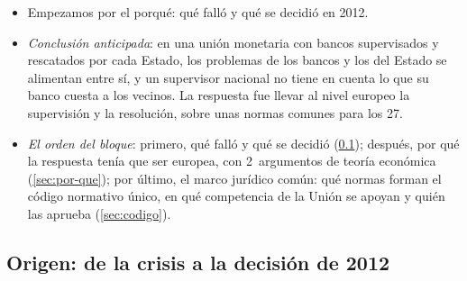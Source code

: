 \documentclass[11pt]{article}
\begin{document}
\begin{itemize}
\item Empezamos por el porqué: qué falló y qué se decidió en 2012.
\item \emph{Conclusión anticipada}: en una unión monetaria con bancos supervisados y rescatados por cada Estado, los problemas de los bancos y los del Estado se alimentan entre sí, y un supervisor nacional no tiene en cuenta lo que su banco cuesta a los vecinos. La respuesta fue llevar al nivel europeo la supervisión y la resolución, sobre unas normas comunes para los 27.
\item \emph{El orden del bloque}: primero, qué falló y qué se decidió (\ref{sec:origen-crisis}); después, por qué la respuesta tenía que ser europea, con 2~argumentos de teoría económica (\ref{sec:por-que}); por último, el marco jurídico común: qué normas forman el código normativo único, en qué competencia de la Unión se apoyan y quién las aprueba (\ref{sec:codigo}).
\end{itemize}

\subsection{Origen: de la crisis a la decisión de 2012}\label{sec:origen-crisis}
\end{document}
